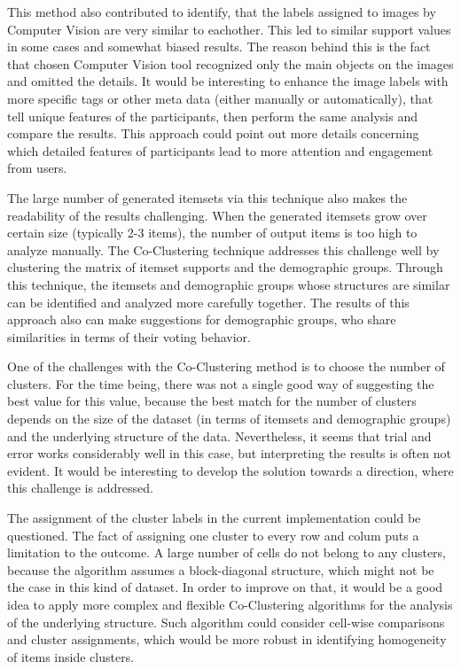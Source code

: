This method also contributed to identify, that the labels assigned to images by Computer Vision are very similar to eachother. This led to similar support values in some cases and somewhat biased results. The reason behind this is the fact that chosen Computer Vision tool recognized only the main objects on the images and omitted the details. It would be interesting to enhance the image labels with more specific tags or other meta data (either manually or automatically), that tell unique features of the participants, then perform the same analysis and compare the results. This approach could point out more details concerning which detailed features of participants lead to more attention and engagement from users.

The large number of generated itemsets via this technique also makes the readability of the results challenging. When the generated itemsets grow over certain size (typically 2-3 items), the number of output items is too high to analyze manually. The Co-Clustering technique addresses this challenge well by clustering the matrix of itemset supports and the demographic groups. Through this technique, the itemsets and demographic groups whose structures are similar can be identified and analyzed more carefully together. The results of this approach also can make suggestions for demographic groups, who share similarities in terms of their voting behavior.

One of the challenges with the Co-Clustering method is to choose the number of clusters. For the time being, there was not a single good way of suggesting the best value for this value, because the best match for the number of clusters depends on the size of the dataset (in terms of itemsets and demographic groups) and the underlying structure of the data. Nevertheless, it seems that trial and error works considerably well in this case, but interpreting the results is often not evident. It would be interesting to develop the solution towards a direction, where this challenge is addressed.

The assignment of the cluster labels in the current implementation could be questioned. The fact of assigning one cluster to every row and colum puts a limitation to the outcome. A large number of cells do not belong to any clusters, because the algorithm assumes a block-diagonal structure, which might not be the case in this kind of dataset. In order to improve on that, it would be a good idea to apply more complex and flexible Co-Clustering algorithms for the analysis of the underlying structure. Such algorithm could consider cell-wise comparisons and cluster assignments, which would be more robust in identifying homogeneity of items inside clusters. 

